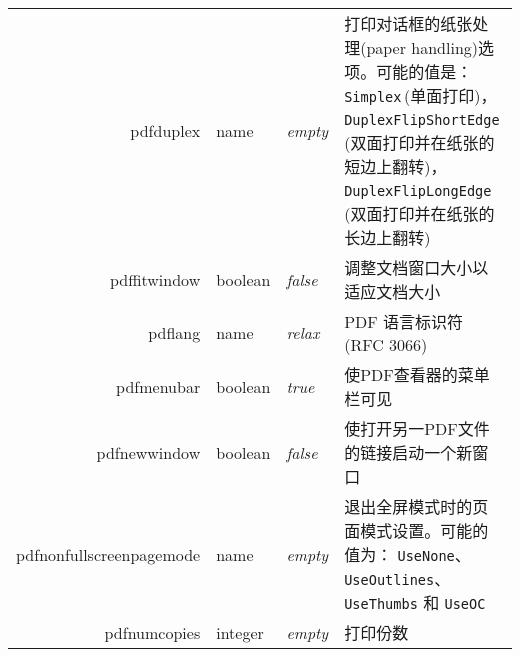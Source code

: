 \documentclass{article}
\begin{document}
\begin{longtable}{@{}>{\ttfamily}r>{\raggedright}p{}>{\itshape}lp{7cm}@{}}
    pdfduplex           & name           & empty                     & 打印对话框的纸张处理(paper handling)选项。可能的值是：
    \verb|Simplex|\,(单面打印)，
    \verb|DuplexFlipShortEdge|\,(双面打印并在纸张的短边上翻转)，
    \verb|DuplexFlipLongEdge|\,(双面打印并在纸张的长边上翻转)                                                                                                                                                                                                                                                     \\

    pdffitwindow        & boolean        & false                     & 调整文档窗口大小以适应文档大小                                                                                                                                                                                                              \\
    pdflang             & name           & relax                     & PDF 语言标识符 (RFC 3066)                                                                                                                                                                                                         \\
    pdfmenubar          & boolean        & true                      & 使PDF查看器的菜单栏可见                                                                                                                                                                                                                \\
    pdfnewwindow        & boolean        & false                     & 使打开另一PDF文件的链接启动一个新窗口                                                                                                                                                                                                         \\
    pdfnonfullscreenpagemode
                        & name           & empty                     & 退出全屏模式时的页面模式设置。可能的值为：
    \verb|UseNone|、\verb|UseOutlines|、\verb|UseThumbs| 和 \verb|UseOC|                                                                                                                                                                                                                               \\
    pdfnumcopies        & integer        & empty                     & 打印份数                                                                                                                                                                                                                         \\

\end{longtable}
\end{document}
